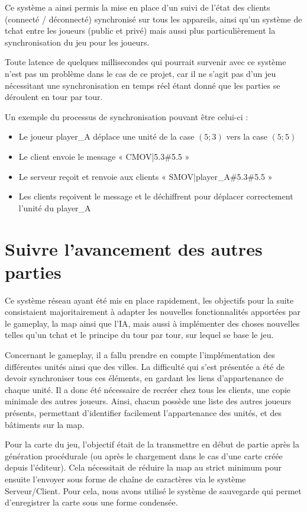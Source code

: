 \documentclass[12pt]{report}
\begin{document}
\newpage

Ce système a ainsi permis la mise en place d’un suivi de l’état des clients
(connecté / déconnecté) synchronisé sur tous les appareils, ainsi qu’un système
de tchat entre les joueurs (public et privé) mais aussi plus particulièrement la
synchronisation du jeu pour les joueurs.

Toute latence de quelques millisecondes qui pourrait survenir avec ce système
n’est pas un problème dans le cas de ce projet, car il ne s’agit pas d’un jeu
nécessitant une synchronisation en temps réel étant donné que les parties se
déroulent en tour par tour.

Un exemple du processus de synchronisation pouvant être celui-ci :

\begin{itemize}
    \item Le joueur player\_A déplace une unité de la case $(5; 3)$ vers la case
        $(5; 5)$
    \item Le client envoie le message « CMOV|5.3\#5.5 »
    \item Le serveur reçoit et renvoie aux clients « SMOV|player\_A\#5.3\#5.5 »
    \item Les clients reçoivent le message et le déchiffrent pour déplacer
        correctement l’unité du player\_A
\end{itemize}

\section{Suivre l’avancement des autres parties}

Ce système réseau ayant été mis en place rapidement, les objectifs pour la suite
consistaient majoritairement à adapter les nouvelles fonctionnalités apportées
par le gameplay, la map ainsi que l’IA, mais aussi à implémenter des choses
nouvelles telles qu’un tchat et le principe du tour par tour, sur lequel se base
le jeu.

Concernant le gameplay, il a fallu prendre en compte l’implémentation des
différentes unités ainsi que des villes. La difficulté qui s’est présentée a été
de devoir synchroniser tous ces éléments, en gardant les liens d’appartenance de
chaque unité. Il a donc été nécessaire de recréer chez tous les clients, une
copie minimale des autres joueurs. Ainsi, chacun possède une liste des autres
joueurs présents, permettant d’identifier facilement l’appartenance des unités,
et des bâtiments sur la map.

Pour la carte du jeu, l’objectif était de la transmettre en début de partie
après la génération procédurale (ou après le chargement dans le cas d'une carte
créée depuis l'éditeur). Cela nécessitait de réduire la map au strict minimum
pour ensuite l’envoyer sous forme de chaîne de caractères via le système
Serveur/Client. Pour cela, nous avons utilisé le système de sauvegarde qui
permet d’enregistrer la carte sous une forme condensée. 
\end{document}
